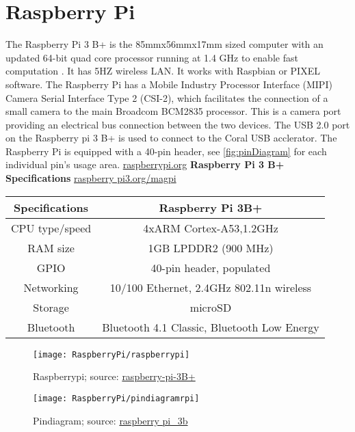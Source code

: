 %
%





\section{Raspberry Pi}

The Raspberry Pi 3 B+ is the 85mmx56mmx17mm sized computer with an updated 64-bit quad core processor running at 1.4 GHz to enable fast computation .
 It has 5HZ  wireless LAN. It works with  Raspbian or PIXEL software. The Raspberry Pi has a Mobile Industry Processor Interface (MIPI) Camera Serial Interface Type 2 (CSI-2), which facilitates the connection of a small camera to the main Broadcom BCM2835 processor. This is a camera port providing an electrical bus connection between the two devices.
The USB 2.0 port on the Raspberry pi 3 B+ is used to connect to the Coral USB acclerator. The Raspberry Pi is equipped with a 40-pin header, see \autoref{fig:pinDiagram} for each individual pin's usage area. \href{https://www.raspberrypi.org/products/raspberry-pi-3-model-b-plus/}{\color{blue}raspberrypi.org}
\clearpage
\textbf{Raspberry Pi 3 B+ Specifications} \href{https://www.raspberrypi.org/magpi/raspberry-pi-3-specs-benchmarks/}{raspberry pi3.org/magpi}
\begin{center}
 \begin{tabular}{
|c| c|} 
 \hline
 Specifications &Raspberry Pi 3B+\\
 \hline\hline
  CPU type/speed&4xARM Cortex-A53,1.2GHz \\ 
 \hline
 RAM size& 1GB LPDDR2 (900 MHz)\\
 \hline
 GPIO& 40-pin header, populated\\
 \hline
 Networking &10/100 Ethernet, 2.4GHz 802.11n wireless\\
 \hline
 Storage&microSD\\
 \hline
 Bluetooth & Bluetooth 4.1 Classic, Bluetooth Low Energy\\
 \hline
 \end{tabular}
\end{center}

\begin{figure}[!h]
\centering
\texttt{[image: RaspberryPi/raspberrypi]} 
\caption{Raspberrypi; source: \href{https://www.raspberrypi.org/products/raspberry-pi-3-model-b-plus/}{raspberry-pi-3B+} }
\end{figure}
\begin{figure}[!h]
\centering
\texttt{[image: RaspberryPi/pindiagramrpi]}
\caption{Pindiagram; source: \href {https://www.mobilefish.com/images/developer/raspberry\_pi3\_model\_b\_pin\_diagram.jpg}{raspberry pi\_3b}}
\label{fig:pinDiagram}
\end{figure}
\clearpage

